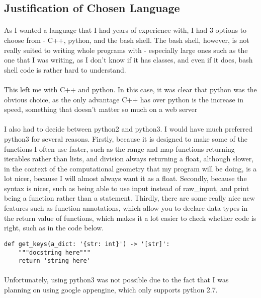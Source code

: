 \subsection{Justification of Chosen Language}
\paragraph{}
As I wanted a language that I had years of experience with, I had 3 options to choose from - C++, python, and the bash shell. The bash shell, however, is not really suited to writing whole programs with - especially large ones such as the one that I was writing, as I don't know if it has classes, and even if it does, bash shell code is rather hard to understand.

\paragraph{}
This left me with C++ and python. In this case, it was clear that python was the obvious choice, as the only advantage C++ has over python is the increase in speed, something that doesn't matter so much on a web server

\paragraph{}
I also had to decide between python2 and python3. I would have much preferred python3 for several reasons. Firstly, because it is designed to make some of the functions I often use faster, such as the range and map functions returning iterables rather than lists, and division always returning a float, although slower, in the context of the computational geometry that my program will be doing, is a lot nicer, because I will almost always want it as a float. Secondly, because the syntax is nicer, such as being able to use input instead of raw\_input, and print being a function rather than a statement. Thirdly, there are some really nice new features such as function annotations, which allow you to declare data types in the return value of functions, which makes it a lot easier to check whether code is right, such as in the code below.

\begin{verbatim}
def get_keys(a_dict: '{str: int}') -> '[str]':
    """docstring here"""
    return 'string here'
\end{verbatim}

\paragraph{}
Unfortunately, using python3 was not possible due to the fact that I was planning on using google appengine, which only supports python 2.7.

